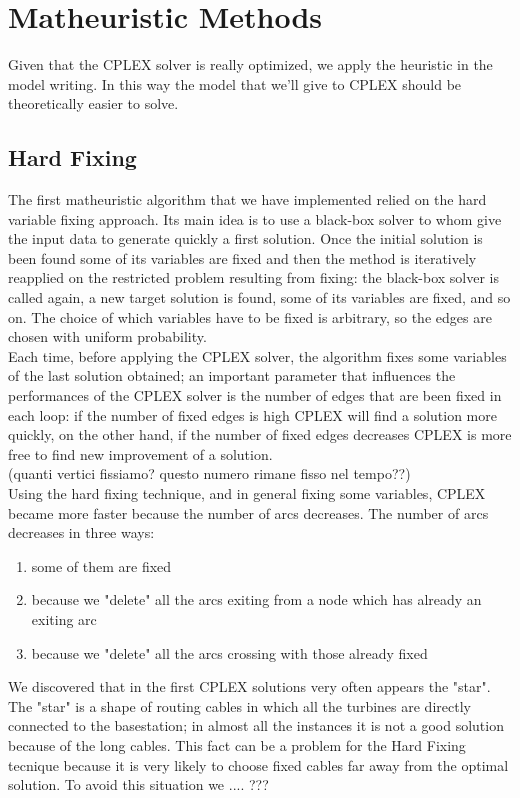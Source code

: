 
\chapter{Matheuristic Methods}
\label{chp:4-Matheuristics}
Given that the \textsc{CPLEX} solver is really optimized, we apply the heuristic in the model writing. In this way the model that we’ll give to \textsc{CPLEX} should be theoretically easier to solve.

\section{Hard Fixing}
The first matheuristic algorithm that we have implemented relied on the hard variable fixing approach. Its main idea is to use a black-box solver to whom give the input data to generate quickly a first solution. Once the initial solution is been found some of its variables are fixed and then the method is iteratively reapplied on the restricted problem resulting from fixing: the black-box solver is called again, a new target solution is found, some of its variables are fixed, and so on. The choice of which variables have to be fixed is arbitrary, so the edges are chosen with uniform probability.\\
Each time, before applying the \textsc{CPLEX} solver, the algorithm fixes some variables of the last solution obtained; an important parameter that influences the performances of the \textsc{CPLEX} solver is the number of edges that are been fixed in each loop: if the number of fixed edges is high \textsc{CPLEX} will find a solution more quickly, on the other hand, if the number of fixed edges decreases \textsc{CPLEX} is more free to find new improvement of a solution. \\
(quanti vertici fissiamo? questo numero rimane fisso nel tempo??)\\
Using the hard fixing technique, and in general fixing some variables, \textsc{CPLEX} became more faster because the number of arcs decreases. The number of arcs decreases in three ways: 
\begin{enumerate}
\item some of them are fixed
\item because we "delete" all the arcs exiting from a node which has already an exiting arc
\item because we "delete" all the arcs crossing with those already fixed 
\end{enumerate}
We discovered that in the first \textsc{CPLEX} solutions very often appears the "star". The "star" is a shape of routing cables in which all the turbines are directly connected to the basestation; in almost all the instances it is not a good solution because of the long cables. This fact can be a problem for the Hard Fixing tecnique because it is very likely to choose fixed cables far away from the optimal solution. To avoid this situation we .... ??? \\ 

